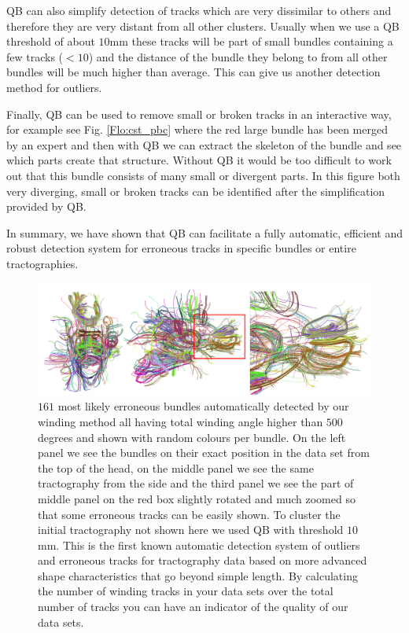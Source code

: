 \documentclass[preprint,authoryear,a4paper,10pt,onecolumn]{elsarticle}
\begin{document}
QB can also simplify detection of tracks which are very dissimilar to
others and therefore they are very distant from all other clusters.
Usually when we use a QB threshold of about $10$mm these tracks will be
part of small bundles containing a few tracks ($<10$) and the distance
of the bundle they belong to from all other bundles will be much higher
than average. This can give us another detection method for outliers.

Finally, QB can be used to remove small or broken tracks in an
interactive way, for example see Fig. \ref{Flo:cst_pbc} where the red
large bundle has been merged by an expert and then with QB we can
extract the skeleton of the bundle and see which parts create that
structure. Without QB it would be too difficult to work out that this
bundle consists of many small or divergent parts. In this figure both
very diverging, small or broken tracks can be identified after the
simplification provided by QB.

In summary, we have shown that QB can facilitate a fully automatic,
efficient and robust detection system for erroneous tracks in specific
bundles or entire tractographies.

\begin{figure}
\begin{centering}
\includegraphics[scale=0.65]{last_figures/erroneous_tracks}
\par\end{centering}
\caption{$161$ most likely erroneous bundles automatically detected by
  our winding method all having total winding angle higher than $500$
  degrees and shown with random colours per bundle. On the left panel we
  see the bundles on their exact position in the data set from the top
  of the head, on the middle panel we see the same tractography from the
  side and the third panel we see the part of middle panel on the red
  box slightly rotated and much zoomed so that some erroneous tracks can
  be easily shown. To cluster the initial tractography not shown here we
  used QB with threshold $10$mm. This is the first known automatic
  detection system of outliers and erroneous tracks for tractography
  data based on more advanced shape characteristics that go beyond
  simple length. By calculating the number of winding tracks in your
  data sets over the total number of tracks you can have an indicator of
  the quality of our data sets.\label{Flo:erroneous_tracks}}
\end{figure}
\end{document}
